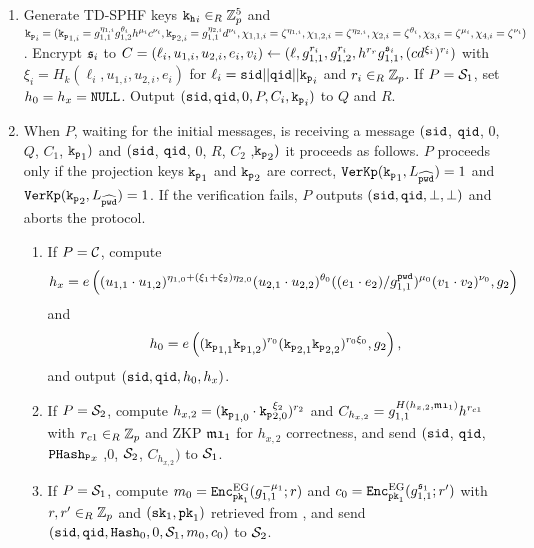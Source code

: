 	
	  \begin{enumerate}
	    \item Generate \ac{TD-SPHF} keys $\mathtt{k_h}_i\in_R\mathbb{Z}_p^{5}$ and 
	      $\mathtt{k_p}_i=(\mathtt{k_p}_{1,i}=g_{1,1}^{\eta_{1,i}} g_{1,2}^{\theta_i} h^{\mu_i} c^{\nu_i}, \mathtt{k_p}_{2,i}=g_{1,1}^{\eta_{2,i}} d^{\nu_i}, \chi_{1,1,i}={\zeta}^{\eta_{1,i}}, \chi_{1,2,i}={\zeta}^{\eta_{2,i}}, \chi_{2,i}={\zeta}^{\theta_i}, \chi_{3,i}={\zeta}^{\mu_i}, \chi_{4,i}={\zeta}^{\nu_i})$. 
	    Encrypt $\mathfrak{s}_i$ to $C=(\ell_i,u_{1,i},u_{2,i},e_i,v_i)\gets(\ell, g_{1,1}^{r_i}, g_{1,2}^{r_i}, h^{r_r} g_{1,1}^{\mathfrak{s}_i}, (cd^{\xi_i})^{r_i})$ with $\xi_i=H_k(\ell_i, u_{1,i}, u_{2,i}, e_i)$ for $\ell_i=\mathtt{sid} || \mathtt{qid} || \mathtt{k_p}_i$ and $r_i\in_R\mathbb{Z}_p$.
	    If $P=\mathcal{S}_1$, set $h_0=h_x=\mathtt{NULL}$.
	    Output $(\mathtt{sid},\mathtt{qid},0,P,C_i,\mathtt{k_p}_i)$ to $Q$ and $R$.
	    
	    \item When $P$, waiting for the initial messages, is receiving a message $(\mathtt{sid}$, $\mathtt{qid}$, $0$, $Q$, $C_1$, $\mathtt{k_p}_1)$ and $(\mathtt{sid}$, $\mathtt{qid}$, $0$, $R$, $C_2$ ,$\mathtt{k_p}_2)$ it proceeds as follows.
	      $P$ proceeds only if the projection keys $\mathtt{k_p}_1$ and $\mathtt{k_p}_2$ are correct, \ie $\mathtt{VerKp}(\mathtt{k_p}_1, L_{\widehat{\mathtt{pwd}}})=1$ and $\mathtt{VerKp}(\mathtt{k_p}_2, L_{\widehat{\mathtt{pwd}}})=1$.
	          If the verification fails, $P$ outputs $(\mathtt{sid}, \mathtt{qid}, \bot, \bot)$ and aborts the protocol.
	      \begin{enumerate}
	        \item If $P=\mathcal{C}$, compute \\
	          \[h_x=e\left((u_{1,1}\cdot u_{1,2})^{\eta_{1,0}+(\xi_1+\xi_2)\eta_{2,0}} (u_{2,1}\cdot u_{2,2})^{\theta_0} ((e_1\cdot e_2)/g_{1,1}^{\mathtt{pwd}})^{\mu_0} (v_1\cdot v_2)^{\nu_0}, g_2\right) \] 
	          and \\
	          \[ h_0=e\left( (\mathtt{k_p}_{1,1}\mathtt{k_p}_{1,2})^{r_0} (\mathtt{k_p}_{2,1}\mathtt{k_p}_{2,2})^{r_0\xi_0}, g_2 \right),\]
	          and output $(\mathtt{sid}, \mathtt{qid}, h_0, h_x)$.
	        \item If $P=\mathcal{S}_2$, compute
	          $h_{x,2} = (\mathtt{k_p}_{1,0} \cdot \mathtt{k_p}_{2,0}^{\xi_2})^{r_2}$ and 
	          $C_{h_{x,2}}=g_{1,1}^{H(h_{x,2}, \mathfrak{m1}_{1})} h^{r_{c1}}$ with $r_{c1}\in_R\mathbb{Z}_p$ and \ac{ZKP} $\mathfrak{m1}_1$ for $h_{x,2}$ correctness,
	          and send $(\mathtt{sid}$, $\mathtt{qid}$, $\mathtt{PHash_P}_x$ ,$0$, $\mathcal{S}_2$, $C_{h_{x,2}})$ to $\mathcal{S}_1$.
	        \item If $P=\mathcal{S}_1$, compute
	          $m_{0} = \mathtt{Enc}_{\mathtt{pk}_1}^\mathrm{EG}(g_{1,1}^{-\mu_1}; r)$ and
	          $c_{0} = \mathtt{Enc}_{\mathtt{pk}_1}^\mathrm{EG}(g_{1,1}^{\mathfrak{s}_1}; r')$
	          with $r,r'\in_R\mathbb{Z}_p$ and $(\mathtt{sk}_1,\mathtt{pk}_1)$ retrieved from \Fca, and send $(\mathtt{sid},\mathtt{qid},\mathtt{Hash}_0,0,\mathcal{S}_1,m_0,c_0)$ to $\mathcal{S}_2$.
	      \end{enumerate}
	      

\end{enumerate}

